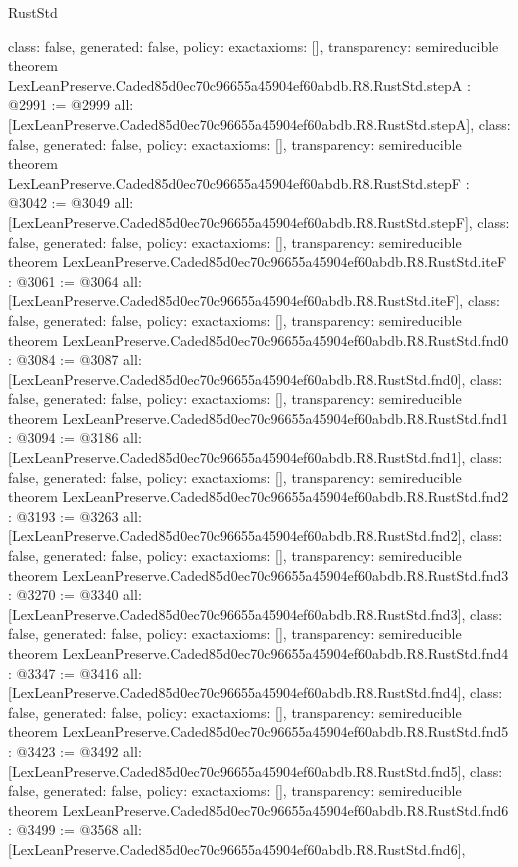 \begin{lexlean}{RustStd}
\begin{coremodule}
{  class: false,
  generated: false,
  policy: exact{axioms: []},
  transparency: semireducible
}
theorem LexLeanPreserve.Caded85d0ec70c96655a45904ef60abdb.R8.RustStd.stepA : @2991 := @2999 {
  all: [LexLeanPreserve.Caded85d0ec70c96655a45904ef60abdb.R8.RustStd.stepA],
  class: false,
  generated: false,
  policy: exact{axioms: []},
  transparency: semireducible
}
theorem LexLeanPreserve.Caded85d0ec70c96655a45904ef60abdb.R8.RustStd.stepF : @3042 := @3049 {
  all: [LexLeanPreserve.Caded85d0ec70c96655a45904ef60abdb.R8.RustStd.stepF],
  class: false,
  generated: false,
  policy: exact{axioms: []},
  transparency: semireducible
}
theorem LexLeanPreserve.Caded85d0ec70c96655a45904ef60abdb.R8.RustStd.iteF : @3061 := @3064 {
  all: [LexLeanPreserve.Caded85d0ec70c96655a45904ef60abdb.R8.RustStd.iteF],
  class: false,
  generated: false,
  policy: exact{axioms: []},
  transparency: semireducible
}
theorem LexLeanPreserve.Caded85d0ec70c96655a45904ef60abdb.R8.RustStd.fnd0 : @3084 := @3087 {
  all: [LexLeanPreserve.Caded85d0ec70c96655a45904ef60abdb.R8.RustStd.fnd0],
  class: false,
  generated: false,
  policy: exact{axioms: []},
  transparency: semireducible
}
theorem LexLeanPreserve.Caded85d0ec70c96655a45904ef60abdb.R8.RustStd.fnd1 : @3094 := @3186 {
  all: [LexLeanPreserve.Caded85d0ec70c96655a45904ef60abdb.R8.RustStd.fnd1],
  class: false,
  generated: false,
  policy: exact{axioms: []},
  transparency: semireducible
}
theorem LexLeanPreserve.Caded85d0ec70c96655a45904ef60abdb.R8.RustStd.fnd2 : @3193 := @3263 {
  all: [LexLeanPreserve.Caded85d0ec70c96655a45904ef60abdb.R8.RustStd.fnd2],
  class: false,
  generated: false,
  policy: exact{axioms: []},
  transparency: semireducible
}
theorem LexLeanPreserve.Caded85d0ec70c96655a45904ef60abdb.R8.RustStd.fnd3 : @3270 := @3340 {
  all: [LexLeanPreserve.Caded85d0ec70c96655a45904ef60abdb.R8.RustStd.fnd3],
  class: false,
  generated: false,
  policy: exact{axioms: []},
  transparency: semireducible
}
theorem LexLeanPreserve.Caded85d0ec70c96655a45904ef60abdb.R8.RustStd.fnd4 : @3347 := @3416 {
  all: [LexLeanPreserve.Caded85d0ec70c96655a45904ef60abdb.R8.RustStd.fnd4],
  class: false,
  generated: false,
  policy: exact{axioms: []},
  transparency: semireducible
}
theorem LexLeanPreserve.Caded85d0ec70c96655a45904ef60abdb.R8.RustStd.fnd5 : @3423 := @3492 {
  all: [LexLeanPreserve.Caded85d0ec70c96655a45904ef60abdb.R8.RustStd.fnd5],
  class: false,
  generated: false,
  policy: exact{axioms: []},
  transparency: semireducible
}
theorem LexLeanPreserve.Caded85d0ec70c96655a45904ef60abdb.R8.RustStd.fnd6 : @3499 := @3568 {
  all: [LexLeanPreserve.Caded85d0ec70c96655a45904ef60abdb.R8.RustStd.fnd6],
}
\end{coremodule}
\end{lexlean}

